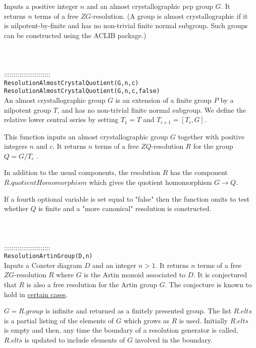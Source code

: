 \documentclass[a4paper,11pt]{report}
\begin{document}
{ Inputs a positive integer $n$ and an almost crystallographic pcp group $G$. It returns $n$ terms of a free $ZG$-resolution. (A group is almost crystallographic if it is nilpotent-by-finite
and has no non-trivial finite normal subgroup. Such groups can be constructed
using the ACLIB package.) \\
 \\
 \\
 \\
 ::::::::::::::::::::::::\\
 \texttt{ResolutionAlmostCrystalQuotient(G,n,c)}\\
 \texttt{ResolutionAlmostCrystalQuotient(G,n,c,false)}\\
 

 An almost crystallographic group $G$ is an extension of a finite group $P$ by a nilpotent group $T$, and has no non-trivial finite normal subgroup. We define the relative lower
central series by setting $T_1=T$ and $T_{i+1}=[T_i,G]$.

 This function inputs an almost crystallographic group $G$ together with positive integers $n$ and $c$. It returns $n$ terms of a free $ZQ$-resolution $R$ for the group $Q=G/T_c$ .

 In addition to the usual components, the resolution $R$ has the component $R.quotientHomomorphism$ which gives the quotient homomorphism $G \longrightarrow Q $.

 If a fourth optional variable is set equal to "false" then the function omits
to test whether $Q$ is finite and a "more canonical" resolution is constructed. \\
 \\
 \\
 \\
 ::::::::::::::::::::::::\\
 \texttt{ResolutionArtinGroup(D,n)}\\
 

 Inputs a Coxeter diagram $D$ and an integer $n>1$. It returns $n$ terms of a free $ZG$-resolution $R$ where $G$ is the Artin monoid associated to $D$. It is conjectured that $R$ is also a free resolution for the Artin group $G$. The conjecture is known to hold in \href{../www/SideLinks/About/aboutArtinGroups.html} {certain cases}.

 $G=R.group$ is infinite and returned as a finitely presented group. The list $R.elts$ is a partial listing of the elements of $G$ which grows as $R$ is used. Initially $R.elts$ is empty and then, any time the boundary of a resolution generator is called, $R.elts$ is updated to include elements of $G$ involved in the boundary.

}
\end{document}
